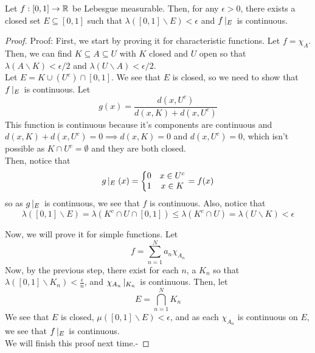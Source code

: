 \begin{theorem}
    Let $f : [0, 1] \to \mathbb{R}$ be Lebesgue measurable. Then, for any $\epsilon > 0$, there exists a closed set $E \subseteq [0, 1]$ such that $\lambda([0, 1] \backslash E) < \epsilon$ and $f\left|_{E}\right.$ is continuous. 
\end{theorem}
\begin{proof}{Proof:}
    First, we start by proving it for characteristic functions. Let $f = \chi_{A}$. Then, we can find $K \subseteq A \subseteq U$ with $K$ closed and $U$ open so that $\lambda(A \backslash K) < \epsilon/2$ and $\lambda(U \backslash A) < \epsilon/2$.\\

    Let $E = K \cup (U^{c}) \cap [0, 1]$. We see that $E$ is closed, so we need to show that $f\left|_{E}\right.$ is continuous. Let 
    \[ g(x) = \frac{d(x, U^{c})}{d(x, K) + d(x, U^{c})} \]
    This function is continuous because it's components are continuous and $d(x, K) + d(x, U^{c}) = 0 \implies d(x, K) = 0$ and $d(x, U^{c}) = 0$, which isn't possible as $K \cap U^{c} = \emptyset$ and they are both closed.\\

    Then, notice that
    \[ g\left|_{E}\right.(x) = \left\{\begin{matrix} 0 & x \in U^{c} \\ 1 & x \in K\end{matrix}\right. = f(x) \]
    so as $g\left|_{E}\right.$ is continuous, we see that $f$ is continuous. Also, notice that 
    \[ \lambda([0, 1] \backslash E) = \lambda(K^{c} \cap U \cap [0, 1]) \leq \lambda(K^{c} \cap U) = \lambda(U \backslash K) < \epsilon \]

    Now, we will prove it for simple functions. Let 
    \[ f = \sum_{n = 1}^{N} a_n\chi_{A_n} \]
    Now, by the previous step, there exist for each $n$, a $K_n$ so that $\lambda([0, 1] \backslash K_n) < \frac{\epsilon}{n}$, and $\chi_{A_n} \left|_{K_n}\right.$ is continuous. Then, let
    \[ E = \bigcap_{n = 1}^{N} K_n \]
    We see that $E$ is closed, $\mu([0, 1] \backslash E) < \epsilon$, and as each $\chi_{A_n}$ is continuous on $E$, we see that $f\left|_{E}\right.$ is continuous.\\

    We will finish this proof next time.-
\end{proof}